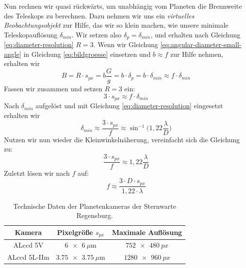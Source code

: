 \documentclass[10pt,a4paper,titlepage]{article}
\begin{document}
Nun rechnen wir quasi rückwärts, um unabhängig vom Planeten die Brennweite des Teleskops zu berechnen. Dazu nehmen wir uns ein \textit{virtuelles Beobachtungsobjekt} zur Hilfe, das wir so klein machen, wie unsere minimale Teleskopauflösung $\delta_{min}$. Wir setzen also $\delta_p = \delta_{min}$, und erhalten nach Gleichung \ref{eq:diameter-resolution} $R = 3$. Wenn wir Gleichung \ref{eq:angular-diameter-small-angle} in Gleichung \ref{eq:bildgroesse} einsetzen und $b \approx f$ zur Hilfe nehmen, erhalten wir
\begin{equation}
B = R \cdot s_{px} = b \frac{G}{g} = b \cdot \delta_{p} = b \cdot \delta_{min} \approx f \cdot \delta_{min}
\end{equation}
Fassen wir zusammen und setzen $R = 3$ ein:
\begin{equation}
3 \cdot s_{px} \approx f \cdot \delta_{min}
\end{equation}
Nach $\delta_{min}$ aufgelöst und mit Gleichung \ref{eq:diameter-resolution} eingesetzt erhalten wir
\begin{equation}
\delta_{min} \approx {\frac{3 \cdot s_{px}}{f}} \approx \sin^{-1}\biggr(1,22 \frac{\lambda}{D}\biggr)
\end{equation}
Nutzen wir nun wieder die Kleinwinkelnäherung, vereinfacht sich die Gleichung zu: 
\begin{equation}
{\frac{3 \cdot s_{px}}{f}} \approx 1,22 \frac{\lambda}{D}
\end{equation}
Zuletzt lösen wir nach $f$ auf:
\begin{equation}
\label{eq:approx-brennweite}
f \approx \frac{3 \cdot D \cdot s_{px}}{1,22 \cdot \lambda}
\end{equation}

\noindent{}

\begin{table}
\begin{center}
\begin{tabular}{|c|c|c|}
\hline
Kamera & Pixelgröße $s_{px}$ & Maximale Auflösung \\
\hline
ALccd 5V & $\SI[output-product = \times]{6 x 6}{\mu\metre}$ & $\SI[output-product = \times]{752 x 480}{px}$\\
ALccd 5L-IIm & $\SI[output-product = \times]{3,75 x 3,75}{\mu\metre}$ & $\SI[output-product = \times]{1280 x 960}{px}$\\
\hline
\end{tabular}
\caption{Technische Daten der Planetenkameras der Sternwarte Regensburg.}
\label{tbl:kameras}
\end{center}
\end{table}
\end{document}
